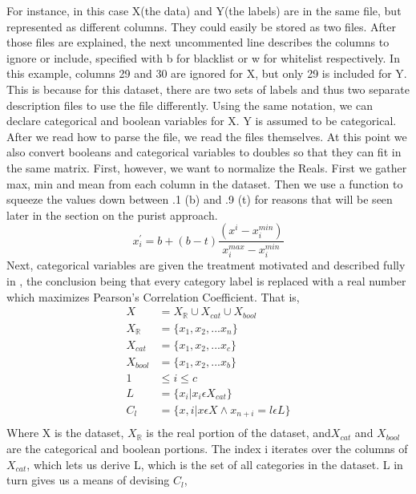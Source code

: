 For instance, in this case X(the data) and Y(the labels) are in the same file,
but represented as different columns.  They could easily be stored as two files.
After those files are explained, the next uncommented line describes the
columns to ignore or include, specified with b for blacklist or w for whitelist
respectively.  In this example, columns 29 and 30 are ignored for X, but only 29
is included for Y.  This is because for this dataset, there are two sets of
labels and thus two separate description files to use the file differently. 
Using the same notation, we can declare categorical and boolean variables for X.
Y is assumed to be categorical.\\
After we read how to parse the file, we read the files themselves.  At this
point we also convert booleans and categorical variables to doubles so that they
can fit in the same matrix.  First, however, we want to normalize the Reals. 
First we gather max, min and mean from each column in the dataset.  Then we use
a function to squeeze the values down between .1 (b) and .9 (t) for reasons that
will be seen later in the section on the purist approach.  
$$x_i^{\prime} = b+(b-t)\frac{(x^i-x_i^{min})}{x_i^{max}-x_i^{min}}$$ Next,
categorical variables are given the treatment motivated and described fully in
\cite{zhang_visual_2015}, the conclusion being that every category label is
replaced with a real number which maximizes Pearson's Correlation Coefficient. 
That is,
\begin{align*}
X &= {X_\mathbb{R} \cup X_{cat} \cup X_{bool}}\\
X_\mathbb{R} &= \{x_1, x_2, ... x_n\}\\
X_{cat} &= \{x_1, x_2, ... x_c\}\\%
X_{bool} &= \{x_1, x_2, ... x_b\} \\
1&\leq i \leq c\\
L &= \{x_i|x_i\epsilon X_{cat}\}\\%
C_l &= \{x, i|  x\epsilon X \wedge x_{n+i} = l\epsilon L \}\\%
\end{align*}
Where X is the dataset, $X_\mathbb{R}$ is the real portion of the dataset, and$
X_{cat}$ and $X_{bool}$ are the categorical and boolean portions.  The index i
iterates over the columns of $X_{cat}$, which lets us derive L, which is the set
of all categories in the dataset.  L in turn gives us a means of devising $C_l$,
